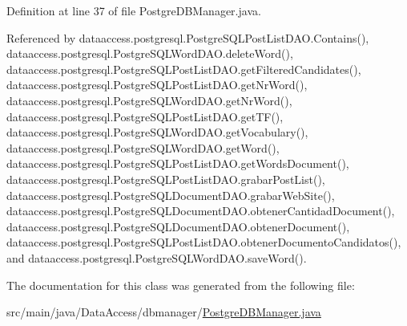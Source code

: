 \-Definition at line 37 of file \-Postgre\-D\-B\-Manager.\-java.



\-Referenced by dataaccess.\-postgresql.\-Postgre\-S\-Q\-L\-Post\-List\-D\-A\-O.\-Contains(), dataaccess.\-postgresql.\-Postgre\-S\-Q\-L\-Word\-D\-A\-O.\-delete\-Word(), dataaccess.\-postgresql.\-Postgre\-S\-Q\-L\-Post\-List\-D\-A\-O.\-get\-Filtered\-Candidates(), dataaccess.\-postgresql.\-Postgre\-S\-Q\-L\-Post\-List\-D\-A\-O.\-get\-Nr\-Word(), dataaccess.\-postgresql.\-Postgre\-S\-Q\-L\-Word\-D\-A\-O.\-get\-Nr\-Word(), dataaccess.\-postgresql.\-Postgre\-S\-Q\-L\-Post\-List\-D\-A\-O.\-get\-T\-F(), dataaccess.\-postgresql.\-Postgre\-S\-Q\-L\-Word\-D\-A\-O.\-get\-Vocabulary(), dataaccess.\-postgresql.\-Postgre\-S\-Q\-L\-Word\-D\-A\-O.\-get\-Word(), dataaccess.\-postgresql.\-Postgre\-S\-Q\-L\-Post\-List\-D\-A\-O.\-get\-Words\-Document(), dataaccess.\-postgresql.\-Postgre\-S\-Q\-L\-Post\-List\-D\-A\-O.\-grabar\-Post\-List(), dataaccess.\-postgresql.\-Postgre\-S\-Q\-L\-Document\-D\-A\-O.\-grabar\-Web\-Site(), dataaccess.\-postgresql.\-Postgre\-S\-Q\-L\-Document\-D\-A\-O.\-obtener\-Cantidad\-Document(), dataaccess.\-postgresql.\-Postgre\-S\-Q\-L\-Document\-D\-A\-O.\-obtener\-Document(), dataaccess.\-postgresql.\-Postgre\-S\-Q\-L\-Post\-List\-D\-A\-O.\-obtener\-Documento\-Candidatos(), and dataaccess.\-postgresql.\-Postgre\-S\-Q\-L\-Word\-D\-A\-O.\-save\-Word().



\-The documentation for this class was generated from the following file\-:\begin{DoxyCompactItemize}
\item 
src/main/java/\-Data\-Access/dbmanager/\hyperlink{_postgre_d_b_manager_8java}{\-Postgre\-D\-B\-Manager.\-java}\end{DoxyCompactItemize}
